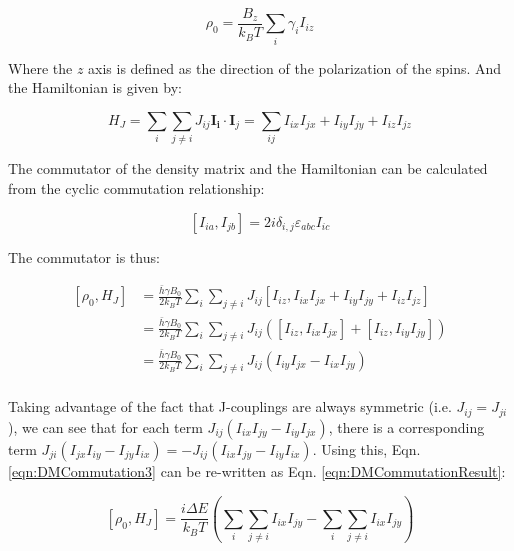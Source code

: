 \documentclass[../PaulGanssle-Thesis.tex]{subfiles}
\begin{document}
\begin{equation*}
\rho_{0} = \frac{B_{z}}{k_{B}T}\sum_{i}\gamma_{i}I_{iz}
\end{equation*}

Where the $z$ axis is defined as the direction of the polarization of the spins. And the Hamiltonian is given by:

\begin{equation*}
H_{J} = \sum_{i}\sum_{j\neq i}J_{ij}\mathbf{I_{i}}\cdot\mathbf{I}_{j} = \sum_{ij}I_{ix}I_{jx} + I_{iy}I_{jy} + I_{iz}I_{jz}
\end{equation*}

The commutator of the density matrix and the Hamiltonian can be calculated from the cyclic commutation relationship:

\begin{equation}
\label{eqn:CyclicCommutation}
\left[I_{ia}, I_{jb}\right] = 2i\delta_{i,j}\varepsilon_{abc}I_{ic}
\end{equation}

The commutator is thus:

\begin{align}
\label{eqn:DMCommutation1}
\left[\rho_{0}, H_{J}\right] & = \frac{\bar{h}\gamma B_{0}}{2k_{B}T}\sum_{i}\sum_{j \neq i}J_{ij}\left[I_{iz}, I_{ix}I_{jx} + I_{iy}I_{jy} + I_{iz}I_{jz}\right]\\
\label{eqn:DMCommutation2}
 & = \frac{\bar{h}\gamma B_{0}}{2k_{B}T}\sum_{i}\sum_{j \neq i}J_{ij}\left(\left[I_{iz}, I_{ix}I_{jx}\right] + \left[I_{iz}, I_{iy}I_{jy}\right]\right) \\
\label{eqn:DMCommutation3}
 & = \frac{\bar{h}\gamma B_{0}}{2k_{B}T}\sum_{i}\sum_{j \neq i}J_{ij}\left(I_{iy}I_{jx} - I_{ix}I_{jy}\right) \\
\end{align}

Taking advantage of the fact that J-couplings are always symmetric (i.e. $J_{ij} = J_{ji}$), we can see that for each term $J_{ij}\left(I_{ix}I_{jy} - I_{iy}I_{jx}\right)$, there is a corresponding term $J_{ji}\left(I_{jx}I_{iy} - I_{jy}I_{ix}\right) = -J_{ij}\left(I_{ix}I_{jy} - I_{iy}I_{ix}\right)$. Using this, Eqn. \ref{eqn:DMCommutation3} can be re-written as Eqn. \ref{eqn:DMCommutationResult}:

\begin{equation}
\left[\rho_{0}, H_{J}\right]  = \frac{i\Delta E}{k_{B}T}\left(\sum_{i}\sum_{j \neq i} I_{ix}I_{jy} - \sum_{i}\sum_{j \neq i} I_{ix}I_{jy}\right)
\label{eqn:DMCommutationResult}
\end{equation}
\end{document}

